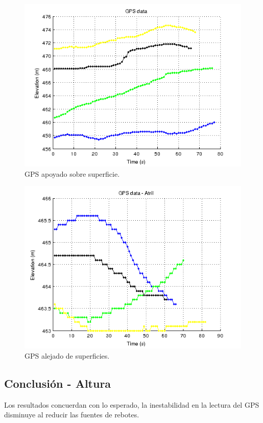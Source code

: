 \documentclass[spanish,12pt,a4paper,titlepage]{report}
\begin{document}
\begin{figure}[h!]
  \begin{center}
  \includegraphics[width=.75\textwidth]{./img/gps_ventana.png}
  \caption{GPS apoyado sobre superficie.}
  \label{fig:gps_ventana.png}
\end{center}
\end{figure}

\newpage
\begin{figure}[h!]
\begin{center}
  \includegraphics[width=.75\textwidth]{./img/gps_atril.png}
  \caption{GPS alejado de superficies.}
  \label{fig:gps_atril.png}
\end{center}
\end{figure}

\subsection{Conclusión - Altura}
\label{sec:error-en-altura-conclusion}

Los resultados concuerdan con lo esperado, la inestabilidad en la lectura del GPS disminuye al reducir las fuentes de rebotes.
\end{document}

